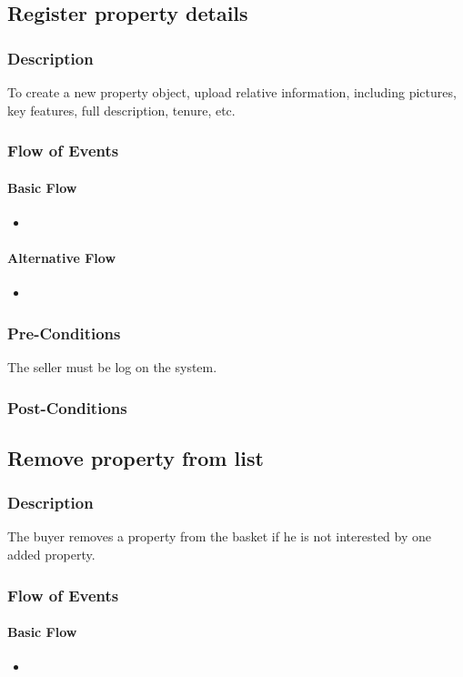 \documentclass[a4paper,12pt]{article}
\begin{document}
\subsection{Register property details}
\subsubsection{Description}
To create a new property object, upload relative information, including pictures, key features, full description, tenure, etc.
\subsubsection{Flow of Events}
\paragraph{Basic Flow}
\begin{itemize}
\item
\end{itemize}
\paragraph{Alternative Flow}
\begin{itemize}
\item
\end{itemize}
\subsubsection{Pre-Conditions}
The seller must be log on the system.
\subsubsection{Post-Conditions}

\subsection{Remove property from list}
\subsubsection{Description}
The buyer removes a property from the basket if he is not interested by one added property.
\subsubsection{Flow of Events}
\paragraph{Basic Flow}
\begin{itemize}
\item
\end{itemize}
\end{document}
